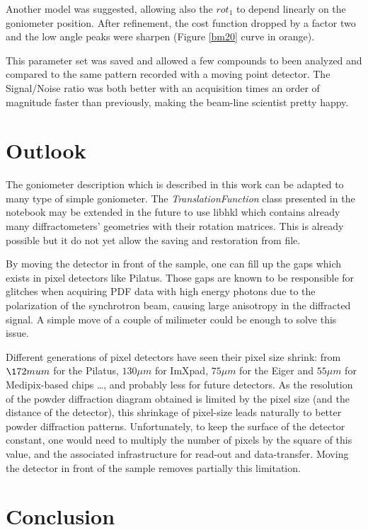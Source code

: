 \documentclass[preprint, pdf]{iucr}              %
\begin{document}
Another model was suggested, allowing also the $rot_1$ to depend linearly on the
goniometer position. 
After refinement, the cost function dropped by a factor two and
the low angle peaks were sharpen (Figure \ref{bm20} curve in orange). 

This parameter set was saved and allowed a few compounds to been analyzed and
compared to the same pattern recorded with a moving point detector. 
The Signal/Noise ratio was both better with an acquisition times an order
of magnitude faster than previously, making the beam-line scientist pretty
happy.

\section{Outlook}

The goniometer description which is described in this work can be adapted to
many type of simple goniometer.
The \textit{TranslationFunction} class presented in the notebook may be extended
in the future to use libhkl\cite{picca} which contains already many
diffractometers' geometries with their rotation matrices. 
This is already possible but it do not yet allow the saving and
restoration from file. 

By moving the detector in front of the sample, one can fill up the
gaps which exists in pixel detectors like Pilatus. 
Those gaps are known to be responsible for glitches
when acquiring PDF data with high energy photons due to the
polarization of the synchrotron beam, causing large anisotropy in the
diffracted signal. 
A simple move of a couple of milimeter could be enough to solve this issue. 

Different generations of pixel detectors have seen their pixel size
shrink:
from $\172 mu m$ for the Pilatus, $130 \mu m$ for ImXpad, $75 \mu m$ for the
Eiger and $55 \mu m$ for Medipix-based chips \ldots, and probably less for
future detectors.
As the resolution of the powder diffraction diagram obtained is limited by the
pixel size (and the distance of the detector), this shrinkage of pixel-size
leads naturally to better powder diffraction patterns. 
Unfortunately, to keep the surface of the detector constant, one would need
to multiply the number of pixels by the square of this value, and the
associated infrastructure for read-out and data-transfer. 
Moving the detector in front of the sample removes partially this limitation.

\section{Conclusion}
\end{document}
